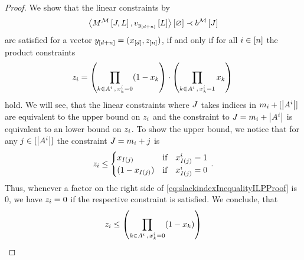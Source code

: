 \begin{proof}
    We show that the linear constraints by
    \begin{align*}
        \left\langle M^{\mathcal{M}}\left[J,L\right],v_{y_{[d+n]}}\left[L\right]\right\rangle \left[ \varnothing \right] \prec b^{\mathcal{M}}\left[J\right]
    \end{align*}
    are satisfied for a vector $y_{[d+n]}=(x_{[d]},z_{[n]})$, if and only if for all $i\in[n]$ the product constraints
    \begin{align}
        \label{eq:slackindexInequalityILPProof}
        z_{i}
        = \left( \prod_{k\in A^{i} \, , \,  x_{k}^{i} = 0} (1 - x_{k} \right)
        \cdot \left( \prod_{k\in A^{i} \, , \,  x_{k}^{i} = 1}  x_{k} \right) \,
    \end{align}
    hold.
    We will see, that the linear constraints where $J$ takes indices in $m_{i}+[\left|A^{i}\right|]$ are equivalent to the upper bound on $z_{i}$ and the constraint to $J=m_{i}+\left|A^{i}\right|$ is equivalent to an lower bound on $z_{i}$.
    To show the upper bound, we notice that for any $j\in[\left|A^{i}\right|]$ the constraint $J = m_{i}+j$ is
    \begin{align*}
        z_{i} \leq
        \begin{cases}
            x_{I(j)}  & \text{if} \quad x_{I(j)}^i = 1 \\
            (1- x_{I(j)}) & \text{if} \quad x_{I(j)}^i = 0 \\
        \end{cases} \, .
    \end{align*}
    Thus, whenever a factor on the right side of \eqref{eq:slackindexInequalityILPProof} is $0$, we have $z_{i}=0$ if the respective constraint is satisfied.
    We conclude, that
    \begin{align*}
        \slackindexof{\decindex}
        \leq \left( \prod_{\catenumerator\in\variablesetof{\decindex} \, , \,  \catindexof{\catenumerator}^\decindex = 0} (1 - \catindexof{\catenumerator}) \right)

\end{align*}
\end{proof}
